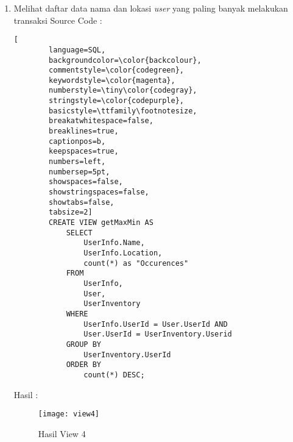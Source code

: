 \begin{enumerate}
	\item Melihat daftar data nama dan lokasi \textit{user} yang paling banyak melakukan transaksi
	Source Code :
	\begin{lstlisting}[
		language=SQL,
		backgroundcolor=\color{backcolour},   
		commentstyle=\color{codegreen},
		keywordstyle=\color{magenta},
		numberstyle=\tiny\color{codegray},
		stringstyle=\color{codepurple},
		basicstyle=\ttfamily\footnotesize,
		breakatwhitespace=false,         
		breaklines=true,                 
		captionpos=b,                    
		keepspaces=true,                 
		numbers=left,                    
		numbersep=5pt,                  
		showspaces=false,                
		showstringspaces=false,
		showtabs=false,                  
		tabsize=2]
		CREATE VIEW getMaxMin AS 
			SELECT
				UserInfo.Name,
				UserInfo.Location,
				count(*) as "Occurences"
			FROM
				UserInfo,
				User,
				UserInventory
			WHERE
				UserInfo.UserId = User.UserId AND
				User.UserId = UserInventory.Userid
			GROUP BY
				UserInventory.UserId
			ORDER BY
				count(*) DESC;
	\end{lstlisting}
	Hasil : 
	\\
	\begin{figure}[H]
		\centering
		\texttt{[image: view4]}
		\caption{Hasil View 4}
	\end{figure}
\end{enumerate}
